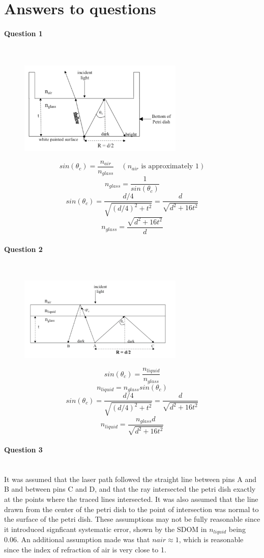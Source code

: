 \documentclass[12pt]{article}
\begin{document}
\newpage
\section{Answers to questions}
\paragraph{Question 1} \mbox{}\\
\begin{figure}[H]
    \centering
    \includegraphics[width=0.7\textwidth]{1.png}
\end{figure}
\[sin(\theta_c)=\frac{n_{air}}{n_{glass}} \quad (\text{$n_{air}$ is approximately 1})\]
\[n_{glass}=\frac{1}{sin(\theta_c)}\]
\[sin(\theta_c)=\frac{d/4}{\sqrt{(d/4)^2+t^2}}=\frac{d}{\sqrt{d^2+16t^2}}\]
\[n_{glass}=\frac{\sqrt{d^2+16t^2}}{d}\]
\newpage
\paragraph{Question 2} \mbox{}\\
\begin{figure}[H]
    \centering
    \includegraphics[width=0.7\textwidth]{2.png}
\end{figure}
\[sin(\theta_c)=\frac{n_{liquid}}{n_{glass}}\]
\[n_{liquid}=n_{glass}sin(\theta_c)\]
\[sin(\theta_c)=\frac{d/4}{\sqrt{(d/4)^2+t^2}}=\frac{d}{\sqrt{d^2+16t^2}}\]
\[n_{liquid}=\frac{n_{glass}d}{\sqrt{d^2+16t^2}}\]
\paragraph{Question 3} \mbox{}\\
It was assumed that the laser path followed the straight line between pins A and B and between pins C and D, and that the ray intersected the petri dish exactly at the points where the traced lines intersected. It was also assumed that the line drawn from the center of the petri dish to the point of intersection was normal to the surface of the petri dish. These assumptions may not be fully reasonable since it introduced signficant systematic error, shown by the SDOM in $n_{liquid}$ being 0.06. An additional assumption made was that $n{air} \approx 1$, which is reasonable since the index of refraction of air is very close to 1.
\end{document}
